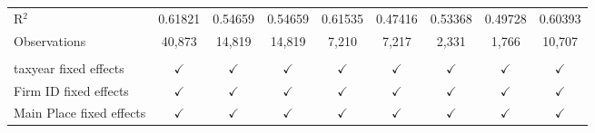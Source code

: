 \begin{tabular}{lcccccccc}
    \\
   R$^2$                                   & 0.61821       & 0.54659       & 0.54659       & 0.61535       & 0.47416        & 0.53368       & 0.49728       & 0.60393\\  
   Observations                            & 40,873        & 14,819        & 14,819        & 7,210         & 7,217          & 2,331         & 1,766         & 10,707\\  
    \\
   taxyear fixed effects                   & $\checkmark$  & $\checkmark$  & $\checkmark$  & $\checkmark$  & $\checkmark$   & $\checkmark$  & $\checkmark$  & $\checkmark$\\   
   Firm ID fixed effects                   & $\checkmark$  & $\checkmark$  & $\checkmark$  & $\checkmark$  & $\checkmark$   & $\checkmark$  & $\checkmark$  & $\checkmark$\\   
   Main Place fixed effects                & $\checkmark$  & $\checkmark$  & $\checkmark$  & $\checkmark$  & $\checkmark$   & $\checkmark$  & $\checkmark$  & $\checkmark$\\   
   \bottomrule
\end{tabular}
\par\endgroup
